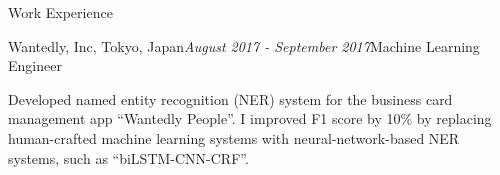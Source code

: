 \begin{rSection}{Work Experience}
\begin{rSubsection}{Wantedly, Inc, Tokyo, Japan}{\em August 2017 - September 2017}{Machine Learning Engineer}{}
\item Developed named entity recognition (NER) system for the business card management app ``Wantedly People''. I improved F1 score by 10\% by replacing human-crafted machine learning systems with neural-network-based NER systems, such as ``biLSTM-CNN-CRF''.
\end{rSubsection}

\end{rSection}